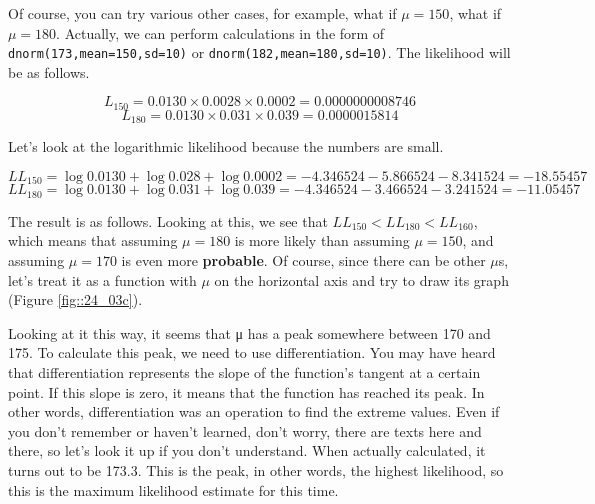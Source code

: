 \documentclass{ltjsbook}
\begin{document}
Of course, you can try various other cases, for example, what if $\mu=150$, what if $\mu=180$. Actually, we can perform calculations in the form of \verb|dnorm(173,mean=150,sd=10)| or \verb|dnorm(182,mean=180,sd=10)|. The likelihood will be as follows.

\[ L_{150} =  0.0130 \times 0.0028\times 0.0002 = 0.0000000008746 \]
\[ L_{180} = 0.0130 \times 0.031 \times 0.039 = 0.0000015814 \]

Let's look at the logarithmic likelihood because the numbers are small.

\[ LL_{150} = \log 0.0130 + \log 0.028 + \log 0.0002 = -4.346524 -5.866524 -8.341524 = -18.55457 \]
\[ LL_{180} = \log 0.0130 + \log 0.031 + \log 0.039 = -4.346524 - 3.466524 -3.241524 = -11.05457 \]

The result is as follows. Looking at this, we see that $LL_{150} < LL_{180} < LL_{160}$, which means that assuming $\mu=180$ is more likely than assuming $\mu=150$, and assuming $\mu=170$ is even more \textbf{probable}.
Of course, since there can be other $\mu$s, let's treat it as a function with $\mu$ on the horizontal axis and try to draw its graph (Figure \ref{fig::24_03c}).


Looking at it this way, it seems that μ has a peak somewhere between 170 and 175. To calculate this peak, we need to use differentiation. You may have heard that differentiation represents the slope of the function's tangent at a certain point. If this slope is zero, it means that the function has reached its peak. In other words, differentiation was an operation to find the extreme values. Even if you don't remember or haven't learned, don't worry, there are texts here and there, so let's look it up if you don't understand. When actually calculated, it turns out to be 173.3. This is the peak, in other words, the highest likelihood, so this is the maximum likelihood estimate for this time.
\end{document}
